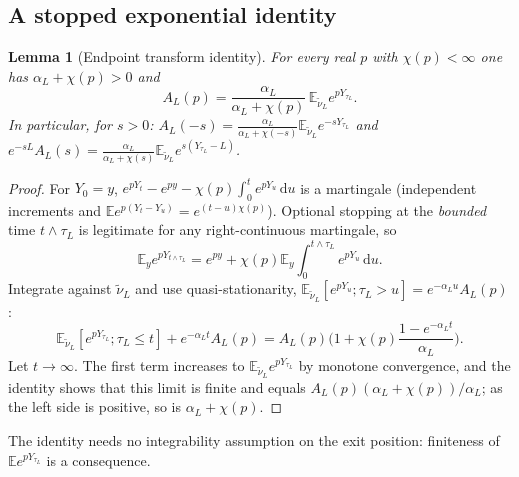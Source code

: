 \documentclass[11pt,a4paper]{article}
\newtheorem{lemma}[theorem]{Lemma}
\theoremstyle{definition}
\theoremstyle{remark}
\newcommand{\E}{\mathbb E}
\newcommand{\1}{\mathbf 1}
\newcommand{\dd}{\,\mathrm d}
\begin{document}
\subsection{A stopped exponential identity}
\begin{lemma}[Endpoint transform identity]\label{lem:dynkin}
For every real $p$ with $\chi(p)<\infty$ one has $\alpha_L+\chi(p)>0$ and
\begin{equation}\label{eq:dynkin-clean}
 A_L(p)=\frac{\alpha_L}{\alpha_L+\chi(p)}\,\E_{\widetilde\nu_L}e^{pY_{\tau_L}}.
\end{equation}
In particular, for $s>0$: $A_L(-s)=\frac{\alpha_L}{\alpha_L+\chi(-s)}\E_{\widetilde\nu_L}e^{-sY_{\tau_L}}$ and $e^{-sL}A_L(s)=\frac{\alpha_L}{\alpha_L+\chi(s)}\E_{\widetilde\nu_L}e^{s(Y_{\tau_L}-L)}$.
\end{lemma}
\begin{proof}
For $Y_0=y$, $e^{pY_t}-e^{py}-\chi(p)\int_0^te^{pY_u}\dd u$ is a martingale (independent increments and $\E e^{p(Y_t-Y_u)}=e^{(t-u)\chi(p)}$). Optional stopping at the \emph{bounded} time $t\wedge\tau_L$ is legitimate for any right-continuous martingale, so
\[
 \E_y e^{pY_{t\wedge\tau_L}}=e^{py}+\chi(p)\E_y\int_0^{t\wedge\tau_L}e^{pY_u}\dd u.
\]
Integrate against $\widetilde\nu_L$ and use quasi-stationarity, $\E_{\widetilde\nu_L}[e^{pY_u};\tau_L>u]=e^{-\alpha_Lu}A_L(p)$:
\[
 \E_{\widetilde\nu_L}[e^{pY_{\tau_L}};\tau_L\le t]+e^{-\alpha_Lt}A_L(p)=A_L(p)\Big(1+\chi(p)\frac{1-e^{-\alpha_Lt}}{\alpha_L}\Big).
\]
Let $t\to\infty$. The first term increases to $\E_{\widetilde\nu_L}e^{pY_{\tau_L}}$ by monotone convergence, and the identity shows that this limit is finite and equals $A_L(p)(\alpha_L+\chi(p))/\alpha_L$; as the left side is positive, so is $\alpha_L+\chi(p)$.
\end{proof}
The identity needs no integrability assumption on the exit position: finiteness of $\E e^{pY_{\tau_L}}$ is a consequence.
\end{document}
